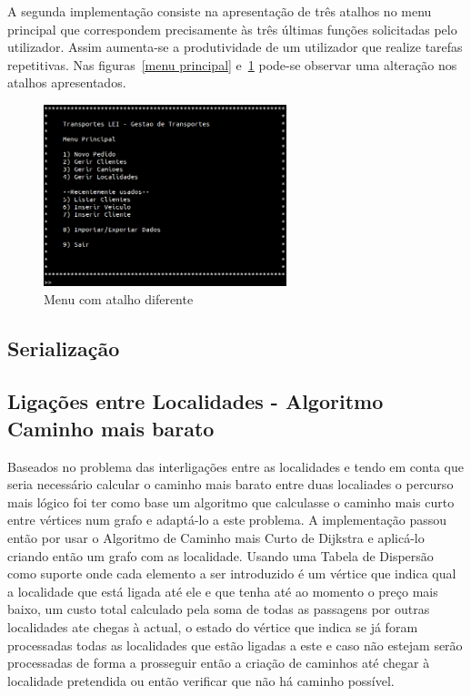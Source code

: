 \documentclass[a5paper,twocolumn, 11pt]{article}
\begin{document}
A segunda implementação consiste na apresentação de três atalhos no menu principal que correspondem precisamente às três últimas funções solicitadas pelo utilizador. Assim aumenta-se a produtividade de um utilizador que realize tarefas repetitivas.
Nas figuras~\ref{menu principal} e~\ref{menu principal com atalho diferente} pode-se observar uma alteração nos atalhos apresentados.
\begin{figure}[hbt]
    \caption[Menu Principal (atalho)]{Menu com atalho diferente}
    \label{menu principal com atalho diferente}
    \centering
        \includegraphics[width=200pt]{menu_com_atalho_diferente.png}
\end{figure}

\clearpage
\subsection{Serialização}



\clearpage
\subsection{Ligações entre Localidades - Algoritmo Caminho mais barato}
Baseados no problema das interligações entre as localidades e tendo em conta que seria necessário calcular o caminho mais barato
entre duas localiades o percurso mais lógico foi ter como base um algoritmo que calculasse o caminho mais curto entre vértices num
grafo e adaptá-lo a este problema. A implementação passou então por usar o Algoritmo de Caminho mais Curto de Dijkstra e aplicá-lo
criando então um grafo com as localidade. Usando uma Tabela de Dispersão como suporte onde cada elemento a ser introduzido é um vértice
que indica qual a localidade que está ligada até ele e que tenha até ao momento o preço mais baixo, um custo total calculado pela soma
de todas as passagens por outras localidades ate chegas à actual, o estado do vértice que indica se já foram processadas todas
as localidades que estão ligadas a este e caso não estejam serão processadas de forma a prosseguir então a criação de caminhos
até chegar à localidade pretendida ou então verificar que não há caminho possível.
\end{document}
